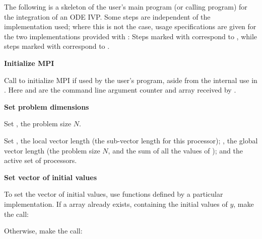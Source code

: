 The following is a skeleton of the user's main program (or calling
program) for the integration of an ODE IVP. Some steps are independent
of the {\nvector} implementation used; where this is not the case, usage
specifications are given for the two implementations provided with {\cvode}:
Steps marked with {\p} correspond to  {\nvecp}, while steps marked with
{\s} correspond to {\nvecs}.
\begin{Steps}
  
\item 
  {\bf {\p} Initialize MPI}

  Call  to initialize MPI if used by
  the user's program, aside from the internal use in {\nvecp}.  
  Here  and  are the command line argument 
  counter and array received by .
  
\item
  {\bf Set problem dimensions}

  {\s} Set , the problem size $N$.

  {\p} Set , the local vector length (the sub-vector
  length for this processor); , the global vector length (the
  problem size $N$, and the sum of all the values of );
  and the active set of processors.
  
\item
  {\bf Set vector of initial values}
 
  To set the vector  of initial values, use functions defined by a
  particular {\nvector} implementation.  If a  array  
  already exists, containing the initial values of $y$, make the call:

  {\s} 

  {\p} 

  Otherwise, make the call:

  {\s} 

  {\p} 


\end{Steps}
